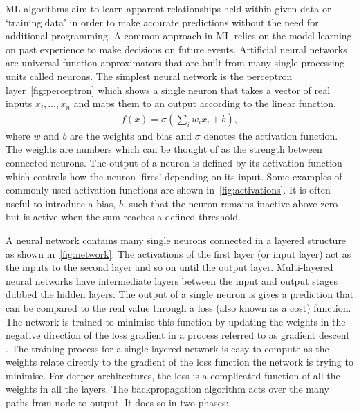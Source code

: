 \documentclass[12pt]{iopart}
\begin{document}
\ac{ML} algorithms aim to learn apparent relationships held within given data or `training
data' in order to make accurate predictions without the need for additional
programming. A common approach in \ac{ML} relies on the model learning on
past experience to make decisions on future events. Artificial neural networks are universal function approximators that are built from many single
processing units called neurons. The simplest neural network is the perceptron
layer~\cref{fig:perceptron} which shows a single neuron that takes a vector of real
inputs $x_{i},\ldots, x_{n}$
and maps them to an output according to the linear function, 
%
\begin{align}
f(x) = \sigma(\sum_i w_i x_i + b),
\label{eqn:neuron}
\end{align}
%
where $w$ and $b$ are the weights and bias and $\sigma$
denotes the activation function. The weights are numbers which can be thought
of as the strength between connected neurons. The output of a neuron is defined by its activation function which controls how the neuron `fires' depending on its input. Some examples of commonly used activation functions are shown in~\cref{fig:activations}. It is often useful to introduce a bias, $b$, such that the neuron remains inactive
above zero but is active when the sum reaches a defined threshold. 

%
A neural network contains many single neurons connected in a layered structure
as shown in~\cref{fig:network}. The activations of the first layer (or
input layer) act as the inputs to the second layer and so on until the output
layer. Multi-layered neural networks have intermediate layers between the input
and output stages dubbed the hidden layers.
%
The output of a single neuron is gives a
prediction that can be compared to the real value through a loss (also known as a
cost) function. The network is trained to minimise this function by updating the weights in the negative
direction of the loss gradient in a process referred to as gradient
descent \cite{ruder2016overview}. The training process for a single layered network is easy to compute as the weights relate directly to the gradient of the loss function the network is trying to minimise. For deeper architectures, the loss is a complicated function of all the weights in all the layers. The backpropagation \cite{Nielsen1992} algorithm acts over the many paths from node to output. It does so in two phases:
\end{document}
